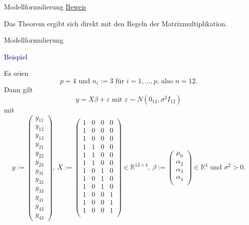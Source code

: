 \documentclass[
  8pt,
  ignorenonframetext,
]{beamer}
\begin{document}
\begin{frame}{Modellformulierung}
\underline{Beweis}

Das Theorem ergibt sich direkt mit den Regeln der Matrixmultiplikation.
\end{frame}

\begin{frame}{Modellformulierung}
\protect\hypertarget{modellformulierung-5}{}
\small

\textcolor{darkblue}{Beispiel}

Es seien \begin{equation}
p = 4 \mbox{ und } n_i := 3 \mbox{ für } i = 1,...,p \mbox{, also } n = 12.
\end{equation} Dann gilt \begin{equation}
y = X\beta + \varepsilon \mbox{ mit } \varepsilon \sim N(0_{12},\sigma^2 I_{12})
\end{equation} mit \footnotesize \begin{equation}
y :=
\begin{pmatrix}
y_{11}  \\
y_{12}  \\
y_{13}  \\
y_{21}  \\
y_{22}  \\
y_{23}  \\
y_{31}  \\
y_{32}  \\
y_{33}  \\
y_{41}  \\
y_{42}  \\
y_{43}
\end{pmatrix},
\,
X :=
\begin{pmatrix}
1  &    0    &  0    &  0  \\
1  &  0  &  0  &  0  \\
1  &    0    &  0  &  0  \\
1  &    1    &  0  &    0  \\
1  &    1  &    0  &    0  \\
1  &    1  &    0    &  0  \\
1    &  0    &  1  &    0  \\
1  &    0  &  1  &  0  \\
1  &    0    &  1    &  0  \\
1  &    0    &  0  &    1  \\
1  &    0  &    0    &  1  \\
1  &    0    &  0  &    1  \\
\end{pmatrix}
\in \mathbb{R}^{12 \times 4},
\,
\beta :=
\begin{pmatrix}
\mu_0       \\
\alpha_2    \\
\alpha_3    \\
\alpha_4    \\
\end{pmatrix}
\in \mathbb{R}^{4}
\mbox{ und }
\sigma^2 > 0.
\end{equation}
\end{frame}
\end{document}
